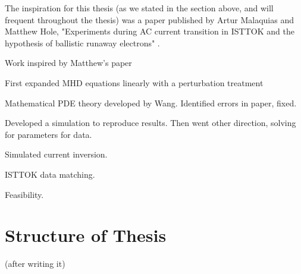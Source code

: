 The inspiration for this thesis (as we stated in the section above, and will frequent throughout the thesis) was a paper 
published by Artur Malaquias and Matthew Hole, "Experiments during AC current transition in ISTTOK and the hypothesis of ballistic 
runaway electrons" \cite{malaquias-matthew}.

\TODO

Work inspired by Matthew's paper 

First expanded MHD equations linearly with a perturbation treatment

Mathematical PDE theory developed by Wang. Identified errors in paper, fixed. 

Developed a simulation to reproduce results. Then went other direction, 
solving for parameters for data. 

Simulated current inversion.

ISTTOK data matching.

Feasibility.



\section{Structure of Thesis}

\TODO (after writing it)
